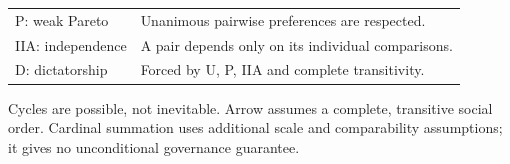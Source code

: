 \begin{minipage}{11.1cm}
{\begin{tabularx}{\linewidth}{@{}p{3.25cm}>{\raggedright\arraybackslash}X@{}}
P: weak Pareto & Unanimous pairwise preferences are respected.\\
IIA: independence & A pair depends only on its individual comparisons.\\
D: dictatorship & Forced by U, P, IIA and complete transitivity.\\
\bottomrule
\end{tabularx}}
\par\smallskip
{\pdfiglabelitalic\raggedright Cycles are possible, not inevitable. Arrow assumes a complete,
transitive social order. Cardinal summation uses additional scale and comparability
assumptions; it gives no unconditional governance guarantee.\par}
\end{minipage}
